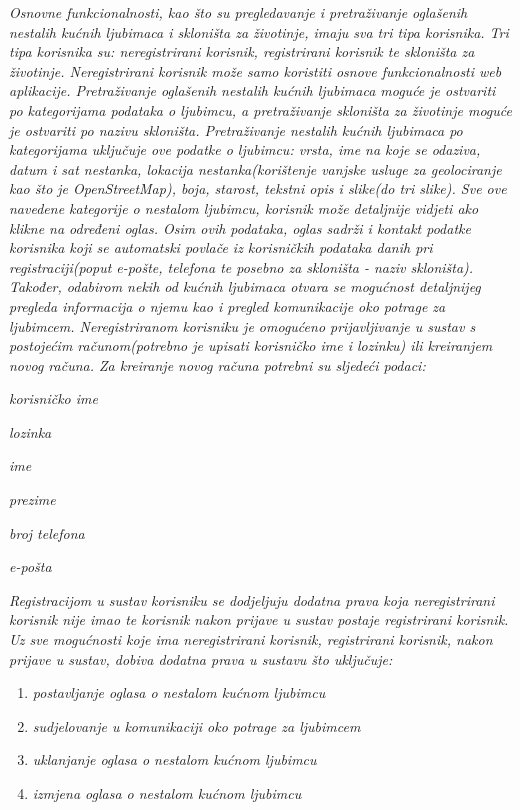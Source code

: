 		\textit{Osnovne funkcionalnosti, kao što su pregledavanje i pretraživanje oglašenih nestalih kućnih ljubimaca i skloništa za životinje, imaju sva tri tipa korisnika. Tri tipa korisnika su: neregistrirani korisnik, registrirani korisnik te skloništa za životinje. Neregistrirani korisnik može samo koristiti osnove funkcionalnosti web aplikacije. Pretraživanje oglašenih nestalih kućnih ljubimaca moguće je ostvariti po kategorijama podataka o ljubimcu, a pretraživanje skloništa za životinje moguće je ostvariti po nazivu skloništa. Pretraživanje nestalih kućnih ljubimaca po kategorijama uključuje ove podatke o ljubimcu: vrsta, ime na koje se odaziva, datum i sat nestanka, lokacija nestanka(korištenje vanjske usluge za geolociranje kao što je OpenStreetMap), boja, starost, tekstni opis i slike(do tri slike). Sve ove navedene kategorije o nestalom ljubimcu, korisnik može detaljnije vidjeti ako klikne na određeni oglas. Osim ovih podataka, oglas sadrži i kontakt podatke korisnika koji se automatski povlače iz korisničkih podataka danih pri registraciji(poput e-pošte, telefona te posebno za skloništa - naziv skloništa). Također, odabirom nekih od kućnih ljubimaca otvara se mogućnost detaljnijeg pregleda informacija o njemu kao i pregled komunikacije oko potrage za ljubimcem. Neregistriranom korisniku je omogućeno prijavljivanje u sustav s postojećim računom(potrebno je upisati korisničko ime i lozinku) ili kreiranjem novog računa.  Za kreiranje novog računa potrebni su sljedeći podaci:}
		
		\begin{packed_item}
			\item \textit{korisničko ime}
			\item \textit{lozinka}
			\item \textit{ime}
			\item \textit{prezime}
			\item \textit{broj telefona}
			\item \textit{e-pošta}
		\end{packed_item}
		
		\textit{Registracijom u sustav korisniku se dodjeljuju dodatna prava koja neregistrirani korisnik nije imao te korisnik nakon prijave u sustav postaje registrirani korisnik. Uz sve mogućnosti koje ima neregistrirani korisnik, registrirani korisnik, nakon prijave u sustav, dobiva dodatna prava u sustavu što uključuje:}
		
		\begin{enumerate}
			\item \textit{postavljanje oglasa o nestalom kućnom ljubimcu}
			\item \textit{sudjelovanje u komunikaciji oko potrage za ljubimcem}
			\item \textit{uklanjanje oglasa o nestalom kućnom ljubimcu}
			\item \textit{izmjena oglasa o nestalom kućnom ljubimcu}
		\end{enumerate}
		
